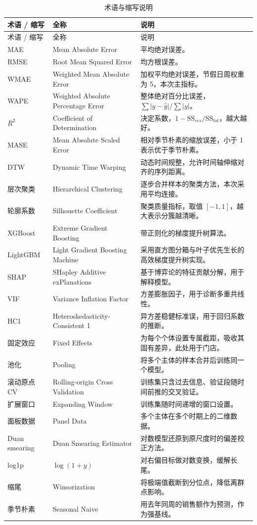 \documentclass[UTF8,a4paper,11pt]{ctexart}
\begin{document}
\small
\begin{longtable}{p{2.3cm} p{4.6cm} p{7.3cm}}
\caption{术语与缩写说明}\\
\toprule
术语 / 缩写 & 全称 & 说明 \\
\midrule
\endfirsthead
\toprule
术语 / 缩写 & 全称 & 说明 \\
\midrule
\endhead
\bottomrule
\endfoot
MAE & Mean Absolute Error & 平均绝对误差。 \\
RMSE & Root Mean Squared Error & 均方根误差。 \\
WMAE & Weighted Mean Absolute Error & 加权平均绝对误差，节假日周权重为 5，本次主指标。 \\
WAPE & Weighted Absolute Percentage Error & 整体绝对百分比误差，$\sum|y-\hat{y}|/\sum|y|$。 \\
$R^2$ & Coefficient of Determination & 决定系数，$1-\mathrm{SS}_{res}/\mathrm{SS}_{tot}$，越大越好。 \\
MASE & Mean Absolute Scaled Error & 相对季节朴素的缩放误差，小于 1 表示优于季节朴素。 \\
DTW & Dynamic Time Warping & 动态时间规整，允许时间轴伸缩对齐的序列距离。 \\
层次聚类 & Hierarchical Clustering & 逐步合并样本的聚类方法，本次采用平均连接。 \\
轮廓系数 & Silhouette Coefficient & 聚类质量指标，取值 $[-1,1]$，越大表示分簇越清晰。 \\
XGBoost & Extreme Gradient Boosting & 带正则化的梯度提升树算法。 \\
LightGBM & Light Gradient Boosting Machine & 采用直方图分箱与叶子优先生长的高效梯度提升树实现。 \\
SHAP & SHapley Additive exPlanations & 基于博弈论的特征贡献分解，用于解释模型。 \\
VIF & Variance Inflation Factor & 方差膨胀因子，用于诊断多重共线性。 \\
HC1 & Heteroskedasticity-Consistent 1 & 异方差稳健标准误，用于回归系数的推断。 \\
固定效应 & Fixed Effects & 为每个个体设置专属截距，吸收其固有差异，此处用于门店。 \\
池化 & Pooling & 将多个主体的样本合并后训练同一个模型。 \\
滚动原点 CV & Rolling-origin Cross Validation & 训练集只含过去信息、验证段随时间前推的交叉验证。 \\
扩展窗口 & Expanding Window & 训练集随时间递增的窗口设置。 \\
面板数据 & Panel Data & 多个主体在多个时期上的二维数据。 \\
Duan smearing & Duan Smearing Estimator & 对数模型还原到原尺度时的偏差校正方法。 \\
log1p & $\log(1+y)$ & 对右偏目标做对数变换，缓解长尾。 \\
缩尾 & Winsorization & 将极端值截断到分位点，降低离群点影响。 \\
季节朴素 & Seasonal Naive & 用去年同周的销售额作为预测，作为强基线。 \\
\end{longtable}
\end{document}
